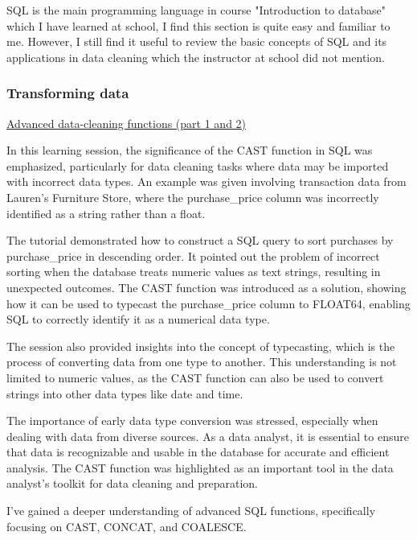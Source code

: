 \documentclass[]{article}
\begin{document}
SQL is the main programming language in course "Introduction to database" which I have learned at school, I find this section is quite easy and familiar to me. However, I still find it useful to review the basic concepts of SQL and its applications in data cleaning which the instructor at school did not mention.

\subsubsection{Transforming data}

\uline{Advanced data-cleaning functions (part 1 and 2)}

In this learning session, the significance of the CAST function in SQL was emphasized, particularly for data cleaning tasks where data may be imported with incorrect data types. An example was given involving transaction data from Lauren's Furniture Store, where the purchase\_price column was incorrectly identified as a string rather than a float.

The tutorial demonstrated how to construct a SQL query to sort purchases by purchase\_price in descending order. It pointed out the problem of incorrect sorting when the database treats numeric values as text strings, resulting in unexpected outcomes. The CAST function was introduced as a solution, showing how it can be used to typecast the purchase\_price column to FLOAT64, enabling SQL to correctly identify it as a numerical data type.

The session also provided insights into the concept of typecasting, which is the process of converting data from one type to another. This understanding is not limited to numeric values, as the CAST function can also be used to convert strings into other data types like date and time.

The importance of early data type conversion was stressed, especially when dealing with data from diverse sources. As a data analyst, it is essential to ensure that data is recognizable and usable in the database for accurate and efficient analysis. The CAST function was highlighted as an important tool in the data analyst's toolkit for data cleaning and preparation.

I've gained a deeper understanding of advanced SQL functions, specifically focusing on CAST, CONCAT, and COALESCE.
\end{document}
